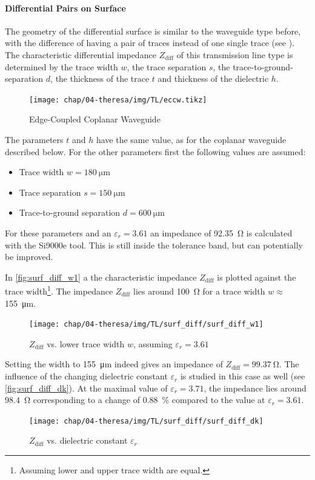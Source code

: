 \paragraph{Differential Pairs on Surface}
The geometry of the differential surface is similar to the waveguide type before, with the difference of having a pair of traces instead of one single trace (see ).
The characteristic differential impedance $Z_\text{diff}$ of this transmission line type is determined by the trace width $w$, the trace separation $s$, the trace-to-ground-separation $d$, the thickness of the trace $t$ and thickness of the dielectric $h$.

\begin{figure}[tb]
	\centering
	\texttt{[image: chap/04-theresa/img/TL/eccw.tikz]}
	\caption{Edge-Coupled Coplanar Waveguide}
	\label{fig:eccw_geometry}
\end{figure}

The parameters $t$ and $h$ have the same value, as for the coplanar waveguide described below.
For the other parameters first the following values are assumed:
\begin{itemize}
	\item Trace width $w = \SI{180}{\micro \meter}$ 
	\item Trace separation $s = \SI{150}{\micro \meter}$
	\item Trace-to-ground separation $d = \SI{600}{\micro \meter}$
\end{itemize}
For these parameters and an $\varepsilon_r = 3.61$ an impedance of \SI{92.35}{\ohm} is calculated with the Si9000e tool.
This is still inside the tolerance band, but can potentially be improved.

In \autoref{fig:surf_diff_w1} a the characteristic impedance $Z_\text{diff}$ is plotted against the trace width\footnote{Assuming lower and upper trace width are equal.}. 
The impedance $Z_\text{diff}$ lies around \SI{100}{\ohm} for a trace width $w \approx$\SI{155}{\micro \meter}.

\begin{figure}[tb]
	\centering
	\texttt{[image: chap/04-theresa/img/TL/surf\_diff/surf\_diff\_w1]}
	\caption[DCWG, $Z_\text{diff}$ vs. $w$]{$Z_\text{diff}$ vs. lower trace width $w$, assuming $\varepsilon_r = 3.61$}
	\label{fig:surf_diff_w1}
\end{figure}
Setting the width to \SI{155}{\micro \meter} indeed gives an impedance of $Z_\text{diff} = \SI{99.37}{\ohm}$.
The influence of the changing dielectric constant $\varepsilon_r$ is studied in this case as well (see \autoref{fig:surf_diff_dk}). 
At the maximal value of $\varepsilon_r = 3.71$, the impedance lies around \SI{98.4}{\ohm} corresponding to a change of \SI{0.88}{\percent} compared to the value at $\varepsilon_r = 3.61$. 
\begin{figure}[tb]
	\centering
	\texttt{[image: chap/04-theresa/img/TL/surf\_diff/surf\_diff\_dk]}
	\caption[DCWG, $Z_\text{diff}$ vs. $\varepsilon_r$]{$Z_\text{diff}$ vs. dielectric constant $\varepsilon_r$}
	\label{fig:surf_diff_dk}
\end{figure}


